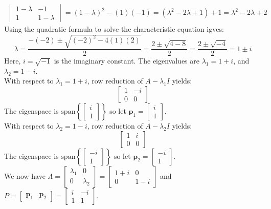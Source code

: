 \documentclass{article}
\begin{document}
\begin{itemize}
\begin{align*}
\begin{vmatrix}
1 - \lambda & -1 \\ 
1 & 1 - \lambda 
\end{vmatrix} = (1 - \lambda)^2 - (1)(-1) 
= (\lambda^2 - 2\lambda + 1) + 1 
= \lambda^2 - 2\lambda + 2
\end{align*}
Using the quadratic formula to solve the characteristic equation igves: 
\[\lambda = \frac{-(-2) \pm \sqrt{(-2)^2 - 4(1)(2)}}{2} = \frac{2 \pm \sqrt{4 - 8}}{2} = \frac{2 \pm \sqrt{-4}}{2} = 1 \pm i\]
Here, \(i = \sqrt{-1}\) is the imaginary constant. The eigenvalues are \(\lambda_1 = 1 + i\), and \(\lambda_2 = 1 - i\). \\
With respect to \(\lambda_1 = 1 + i\), row reduction of \(A - \lambda_1 I\) yields: 
\[\begin{bmatrix} 
1 & -i \\ 
0 & 0 
\end{bmatrix}\]
The eigenspace is \(\text{span}\left\{\begin{bmatrix} i \\ 1 \end{bmatrix}\right\}\) so let \(\mathbf{p}_1 = \begin{bmatrix} i \\ 1 \end{bmatrix}\). \\
With respect to \(\lambda_2 = 1 - i\), row reduction of \(A - \lambda_2 I\) yields: 
\[\begin{bmatrix} 
1 & i \\ 
0 & 0 
\end{bmatrix}\]
The eigenspace is \(\text{span}\left\{\begin{bmatrix} -i \\ 1 \end{bmatrix}\right\}\) so let \(\mathbf{p}_2 = \begin{bmatrix} -i \\ 1 \end{bmatrix}\). \\
We now have \(\Lambda = \begin{bmatrix} \lambda_1 & 0 \\ 0 & \lambda_2 \end{bmatrix} = \begin{bmatrix} 1 + i & 0 \\ 0 & 1 - i \end{bmatrix}\) and \(P = \begin{bmatrix} \mathbf{p}_1 & \mathbf{p}_2 \end{bmatrix} = \begin{bmatrix} i & -i \\ 1 & 1 \end{bmatrix}\).

\end{itemize}
\end{document}
